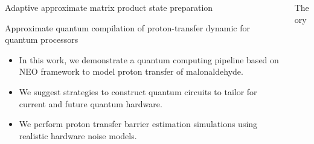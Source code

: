 \documentclass[final,hyperref={pdfpagelabels=false},mathserif]{beamer}
\begin{document}
\begin{columns}[t]
\begin{column}{40cm}
\begin{block}{Adaptive approximate matrix product state preparation}
\begin{itemize}[label=\textbullet, leftmargin=1em]
\end{itemize}

\end{block}

\begin{block}{Approximate quantum compilation of proton-transfer dynamic for quantum processors}
\vspace{-0.7em} %

\begin{tcolorbox}[colframe=blue!50!black, colback=blue!10!white]

\begin{itemize}[label=\textbullet, leftmargin=1em]

\item In this work, we demonstrate a quantum computing pipeline based on \gls{NEO} framework to model proton transfer of malonaldehyde. 

\item We suggest strategies to construct quantum circuits to tailor for current and future quantum hardware.

\item We perform proton transfer barrier estimation simulations using realistic hardware noise models.

\end{itemize}

\end{tcolorbox}
\vspace{-0.5em} %
\end{block}


\end{column}

\begin{column}{40cm}


\begin{block}{Theory}

\begin{itemize}[label=\textbullet, leftmargin=1em]


\end{itemize}
\end{block}
\end{column}
\end{columns}
\end{document}
